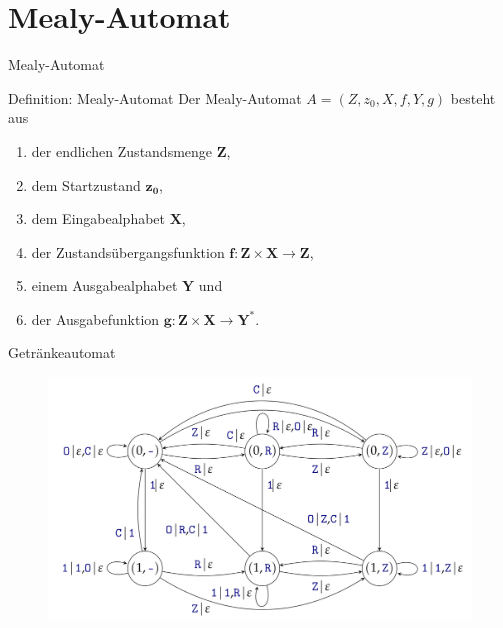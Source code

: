 \section{Mealy-Automat}
\begin{frame}{Mealy-Automat}
    \begin{block}{Definition: Mealy-Automat}
        Der Mealy-Automat $A = \left( Z, z_0, X, f, Y, g \right)$ besteht aus
        \begin{enumerate}
            \item der endlichen Zustandsmenge $\mathbf{Z}$,
            \item dem Startzustand $\mathbf{z_0}$,
            \item dem Eingabealphabet $\mathbf{X}$,
            \item der Zustandsübergangsfunktion $\mathbf{f: Z\times X \rightarrow Z}$,
            \item einem Ausgabealphabet $\mathbf{Y}$ und
            \item der Ausgabefunktion $\mathbf{g: Z\times X \rightarrow Y^*}$.
        \end{enumerate}
    \end{block}
\end{frame}
\begin{frame}{Getränkeautomat}
    \begin{figure}[htbp]
        \centering
        \includegraphics[width=\textwidth,height=\textheight,keepaspectratio]{graphics/10/getraenke2.png}
    \end{figure}
\end{frame}
